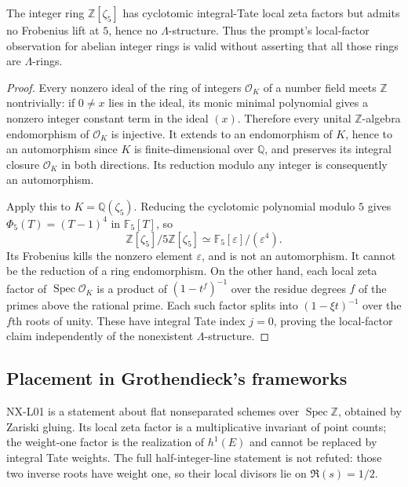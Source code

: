 \begin{proposition}
\label{NX-L07}
The integer ring $\mathbb Z[\zeta_5]$ has cyclotomic integral-Tate
local zeta factors but admits no Frobenius lift at $5$, hence no
$\Lambda$-structure.  Thus the prompt's local-factor observation for
abelian integer rings is valid without asserting that all those
rings are $\Lambda$-rings.
\end{proposition}

\begin{proof}
Every nonzero ideal of the ring of integers $\mathcal O_K$ of a
number field meets $\mathbb Z$ nontrivially: if $0\ne x$ lies in the
ideal, its monic minimal polynomial gives a nonzero integer constant
term in the ideal $(x)$.  Therefore every unital $\mathbb Z$-algebra
endomorphism of $\mathcal O_K$ is injective.  It extends to an
endomorphism of $K$, hence to an automorphism since $K$ is
finite-dimensional over $\mathbb Q$, and preserves its integral
closure $\mathcal O_K$ in both directions.  Its reduction modulo
any integer is consequently an automorphism.

Apply this to $K=\mathbb Q(\zeta_5)$.  Reducing the cyclotomic
polynomial modulo $5$ gives
$\Phi_5(T)=(T-1)^4$ in $\mathbb F_5[T]$, so
\[
 \mathbb Z[\zeta_5]/5\mathbb Z[\zeta_5]
 \simeq\mathbb F_5[\varepsilon]/(\varepsilon^4).
\]
Its Frobenius kills the nonzero element $\varepsilon$, and is not an
automorphism.  It cannot be the reduction of a ring endomorphism.
On the other hand, each local zeta factor of $\operatorname{Spec}\mathcal O_K$
is a product of $(1-t^f)^{-1}$ over the residue degrees $f$ of the
primes above the rational prime.  Each such factor splits into
$(1-\xi t)^{-1}$ over the $f$th roots of unity.  These have integral
Tate index $j=0$, proving the local-factor claim independently of
the nonexistent $\Lambda$-structure.
\end{proof}

\subsection{Placement in Grothendieck's frameworks}

NX-L01 is a statement about flat nonseparated schemes over
$\operatorname{Spec}\mathbb Z$, obtained by Zariski gluing.  Its
local zeta factor is a multiplicative invariant of point counts;
the weight-one factor is the realization of $h^1(E)$ and cannot be
replaced by integral Tate weights.  The full half-integer-line
statement is not refuted: those two inverse roots have weight one,
so their local divisors lie on $\Re(s)=1/2$.

